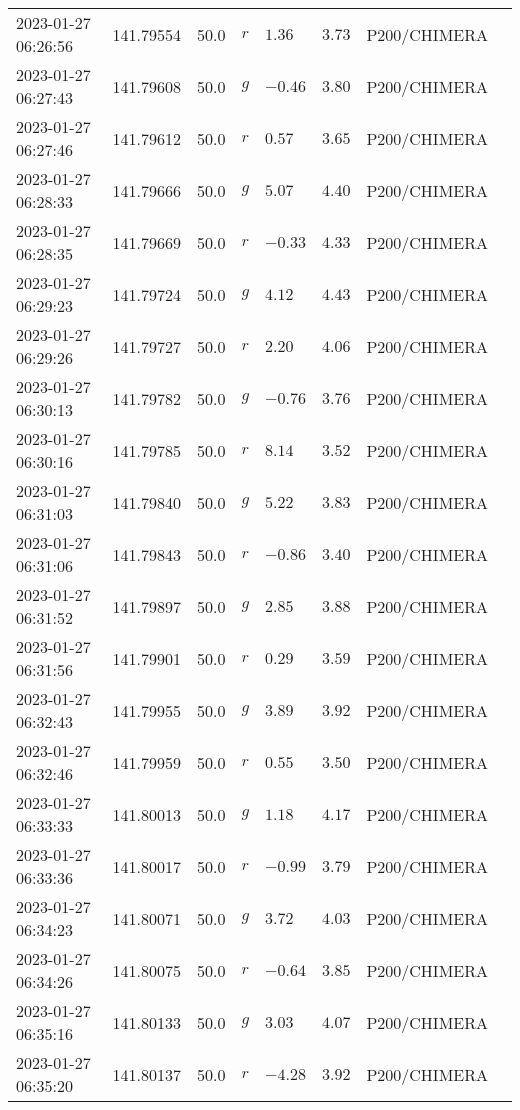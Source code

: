 \documentclass{nature_plusfigure}
\begin{document}
\begin{supplement}
\begin{center}
\begin{longtable}{llllllll}
2023-01-27 06:26:56 & 141.79554 & 50.0 & $r$ & $1.36$ & $3.73$ & P200/CHIMERA &  \\ 
2023-01-27 06:27:43 & 141.79608 & 50.0 & $g$ & $-0.46$ & $3.80$ & P200/CHIMERA &  \\ 
2023-01-27 06:27:46 & 141.79612 & 50.0 & $r$ & $0.57$ & $3.65$ & P200/CHIMERA &  \\ 
2023-01-27 06:28:33 & 141.79666 & 50.0 & $g$ & $5.07$ & $4.40$ & P200/CHIMERA &  \\ 
2023-01-27 06:28:35 & 141.79669 & 50.0 & $r$ & $-0.33$ & $4.33$ & P200/CHIMERA &  \\ 
2023-01-27 06:29:23 & 141.79724 & 50.0 & $g$ & $4.12$ & $4.43$ & P200/CHIMERA &  \\ 
2023-01-27 06:29:26 & 141.79727 & 50.0 & $r$ & $2.20$ & $4.06$ & P200/CHIMERA &  \\ 
2023-01-27 06:30:13 & 141.79782 & 50.0 & $g$ & $-0.76$ & $3.76$ & P200/CHIMERA &  \\ 
2023-01-27 06:30:16 & 141.79785 & 50.0 & $r$ & $8.14$ & $3.52$ & P200/CHIMERA &  \\ 
2023-01-27 06:31:03 & 141.79840 & 50.0 & $g$ & $5.22$ & $3.83$ & P200/CHIMERA &  \\ 
2023-01-27 06:31:06 & 141.79843 & 50.0 & $r$ & $-0.86$ & $3.40$ & P200/CHIMERA &  \\ 
2023-01-27 06:31:52 & 141.79897 & 50.0 & $g$ & $2.85$ & $3.88$ & P200/CHIMERA &  \\ 
2023-01-27 06:31:56 & 141.79901 & 50.0 & $r$ & $0.29$ & $3.59$ & P200/CHIMERA &  \\ 
2023-01-27 06:32:43 & 141.79955 & 50.0 & $g$ & $3.89$ & $3.92$ & P200/CHIMERA &  \\ 
2023-01-27 06:32:46 & 141.79959 & 50.0 & $r$ & $0.55$ & $3.50$ & P200/CHIMERA &  \\ 
2023-01-27 06:33:33 & 141.80013 & 50.0 & $g$ & $1.18$ & $4.17$ & P200/CHIMERA &  \\ 
2023-01-27 06:33:36 & 141.80017 & 50.0 & $r$ & $-0.99$ & $3.79$ & P200/CHIMERA &  \\ 
2023-01-27 06:34:23 & 141.80071 & 50.0 & $g$ & $3.72$ & $4.03$ & P200/CHIMERA &  \\ 
2023-01-27 06:34:26 & 141.80075 & 50.0 & $r$ & $-0.64$ & $3.85$ & P200/CHIMERA &  \\ 
2023-01-27 06:35:16 & 141.80133 & 50.0 & $g$ & $3.03$ & $4.07$ & P200/CHIMERA &  \\ 
2023-01-27 06:35:20 & 141.80137 & 50.0 & $r$ & $-4.28$ & $3.92$ & P200/CHIMERA &  \\ 

\end{longtable}
\end{center}
\end{supplement}
\end{document}

